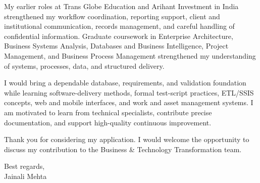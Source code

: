 \documentclass[letterpaper,10pt]{article}
\begin{document}
My earlier roles at Trans Globe Education and Arihant Investment in India strengthened my workflow coordination, reporting support, client and institutional communication, records management, and careful handling of confidential information. Graduate coursework in Enterprise Architecture, Business Systems Analysis, Databases and Business Intelligence, Project Management, and Business Process Management strengthened my understanding of systems, processes, data, and structured delivery.

I would bring a dependable database, requirements, and validation foundation while learning software-delivery methods, formal test-script practices, ETL/SSIS concepts, web and mobile interfaces, and work and asset management systems. I am motivated to learn from technical specialists, contribute precise documentation, and support high-quality continuous improvement.

Thank you for considering my application. I would welcome the opportunity to discuss my contribution to the Business \& Technology Transformation team.

Best regards,\\[8pt]
Jainali Mehta
\end{document}
